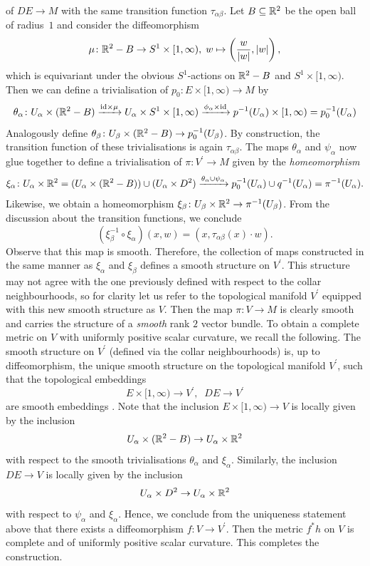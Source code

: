 of $DE \to M$ with the same transition function $\tau_{\alpha\beta}$. Let $B \subseteq \mathbb{R}^2$ be the open ball of radius~$1$ and consider the diffeomorphism
\[
\mu \colon \mathbb{R}^2 - B \to S^1 \times [1,\infty), \; w \mapsto \left( \frac{w}{\lvert w\rvert}, \lvert w\rvert \right),
\]
which is equivariant under the obvious $S^1$-actions on $\mathbb{R}^2 - B$ and $S^1 \times [1,\infty)$. Then we can define a trivialisation of $p_0 \colon E \times [1,\infty) \to M$ by
\[
\theta_\alpha \colon U_\alpha \times (\mathbb{R}^2 - B) \xrightarrow{\mathrm{id} \times \mu} U_\alpha \times S^1 \times [1,\infty) \xrightarrow{\phi_\alpha \times \mathrm{id}} p^{-1}(U_\alpha) \times  [1,\infty) = p_0^{-1}(U_\alpha)
\]
Analogously define $\theta_\beta \colon U_\beta \times (\mathbb{R}^2 - B) \to p_0^{-1}(U_\beta)$. By construction, the transition function of these trivialisations is again $\tau_{\alpha\beta}$. The maps $\theta_\alpha$ and $\psi_\alpha$ now glue together to define a trivialisation of $\pi \colon V^\prime \to M$ given by the \emph{homeomorphism} 
\[
\xi_\alpha \colon U_\alpha \times \mathbb{R}^2 = (U_\alpha \times (\mathbb{R}^2 - B)) \cup (U_\alpha \times D^2)\xrightarrow{\theta_\alpha \cup \psi_\alpha} p_0^{-1}(U_\alpha) \cup q^{-1}(U_\alpha) = \pi^{-1}(U_\alpha).
\] 
Likewise, we obtain a homeomorphism $\xi_\beta \colon  U_\beta \times \mathbb{R}^2 \to \pi^{-1}(U_\beta)$. From the discussion about the transition functions, we conclude 
\[
(\xi_\beta^{-1} \circ \xi_\alpha)(x,w) = (x, \tau_{\alpha\beta}(x) \cdot w).
\]
Observe that this map is smooth. Therefore, the collection of maps constructed in the same manner as $\xi_\alpha$ and $\xi_\beta$ defines a smooth structure on $V^\prime$. This structure may not agree with the one previously defined with respect to the collar neighbourhoods, so for clarity let us refer to the topological manifold $V^\prime$ equipped with this new smooth structure as $V$. Then the map $\pi \colon V \to M$ is clearly smooth and carries the structure of a \emph{smooth} rank $2$ vector bundle. To obtain a complete metric on $V$ with uniformly positive scalar curvature, we recall the following. The smooth structure on $V^\prime$ (defined via the collar neighbourhoods) is, up to diffeomorphism, the unique smooth structure on the topological manifold $V^\prime$, such that the topological embeddings 
\[
E \times [1,\infty) \to V^\prime, \; \; DE \to V^\prime
\]
are smooth embeddings \cite[Thm. 1.4]{Milnor1965}. Note that the inclusion $E \times [1,\infty) \to V$ is locally given by the inclusion
\[
U_\alpha \times (\mathbb{R}^2 - B) \to U_\alpha \times \mathbb{R}^2 
\]
with respect to the smooth trivialisations $\theta_\alpha$ and $\xi_\alpha$. Similarly, the inclusion $DE \to V$ is locally given by the inclusion 
\[
U_\alpha \times D^2 \to U_\alpha \times \mathbb{R}^2 
\]
with respect to $\psi_\alpha$ and $\xi_\alpha$. Hence, we conclude from the uniqueness statement above that there exists a diffeomorphism $f \colon V \to V^\prime$. Then the metric $f^\ast h$ on $V$ is complete and of uniformly positive scalar curvature. This completes the construction.

